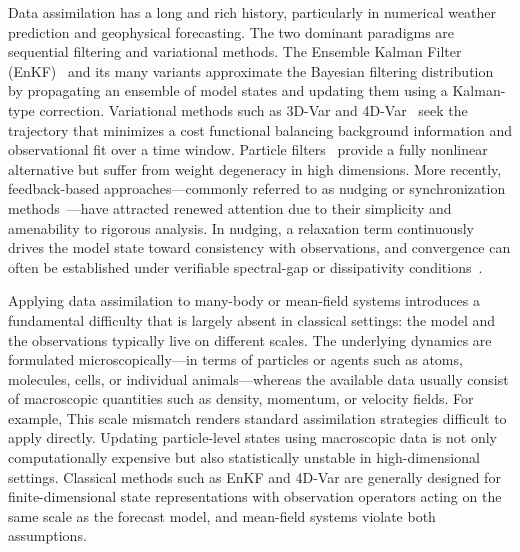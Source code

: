 Data assimilation has a long and rich history, particularly in numerical weather prediction and geophysical forecasting. The two dominant paradigms are sequential filtering and variational methods. The Ensemble Kalman Filter (EnKF)~\cite{evensen2003ensemble,evensen2009data} and its many variants approximate the Bayesian filtering distribution by propagating an ensemble of model states and updating them using a Kalman-type correction. Variational methods such as 3D-Var and 4D-Var~\cite{lorenc1986analysis,courtier1994strategy} seek the trajectory that minimizes a cost functional balancing background information and observational fit over a time window. Particle filters~\cite{de2004sparse,chopin2020introduction} provide a fully nonlinear alternative but suffer from weight degeneracy in high dimensions. More recently, feedback-based approaches---commonly referred to as nudging or synchronization methods~\cite{azouani2014continuous,bessaih2015continuous}---have attracted renewed attention due to their simplicity and amenability to rigorous analysis. In nudging, a relaxation term continuously drives the model state toward consistency with observations, and convergence can often be established under verifiable spectral-gap or dissipativity conditions~\cite{albanez2016continuous,jolly2017data}. 

Applying data assimilation to many-body or mean-field systems introduces a fundamental difficulty that is largely absent in classical settings: the model and the observations typically live on different scales. The underlying dynamics are formulated microscopically---in terms of particles or agents such as atoms, molecules, cells, or individual animals---whereas the available data usually consist of macroscopic quantities such as density, momentum, or velocity fields. For example, This scale mismatch renders standard assimilation strategies difficult to apply directly. Updating particle-level states using macroscopic data is not only computationally expensive but also statistically unstable in high-dimensional settings. Classical methods such as EnKF and 4D-Var are generally designed for finite-dimensional state representations with observation operators acting on the same scale as the forecast model, and mean-field systems violate both assumptions.


